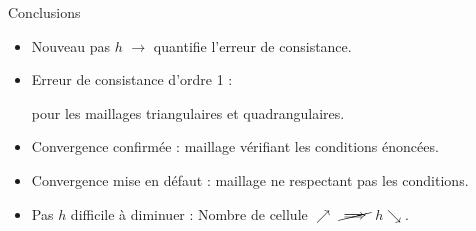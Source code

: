 \documentclass[10pt]{beamer}
\begin{document}
	\begin{frame}
		\begin{center}
			Conclusions\pause
			
			\vspace{.2cm}
			
			\begin{itemize}
				\item Nouveau pas $h$ \pause $\to$ quantifie l'erreur de consistance.\pause
				\item Erreur de consistance d'ordre 1 : \pause \begin{minipage}[t]{5cm}
					pour les maillages triangulaires et quadrangulaires.
				\end{minipage}\pause
				\item Convergence confirmée : \pause maillage vérifiant les conditions énoncées.\pause
				\item Convergence mise en défaut : \pause maillage ne respectant pas les conditions.\pause
				\item Pas $h$ difficile à diminuer : \pause Nombre de cellule $\nearrow$ $\cancel\implies$ $h\searrow$.
			\end{itemize}
		\end{center}
	\end{frame}
	
\end{document}
